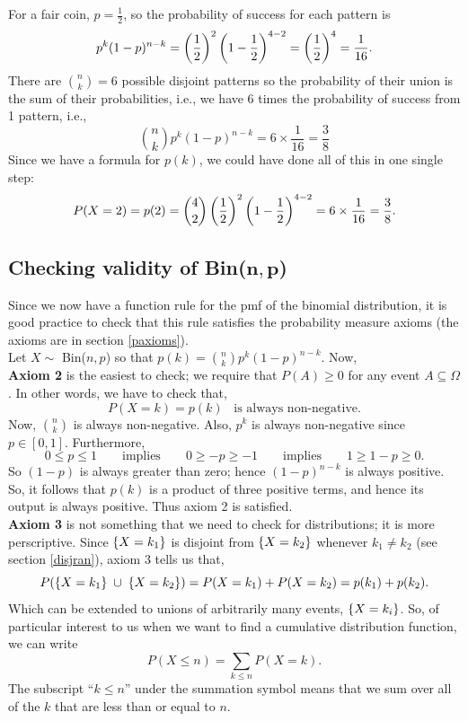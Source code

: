 For a fair coin, $p = \frac{1}{2}$, so the probability of success for each pattern is
\[
p^k(1-p)^{n-k} = \left(\frac{1}{2}\right)^2\left(1-\frac{1}{2}\right)^{4-2} = \left(\frac{1}{2}\right)^4 = \frac{1}{16}.
\]
There are $\binom{n}{k} = 6$ possible disjoint patterns so the probability of their union is the sum of their probabilities, i.e., we have 6 times the probability of success from 1 pattern, i.e., 
\[
\binom{n}{k}p^k(1-p)^{n-k} = 6 \times \frac{1}{16} = \frac{3}{8}
\]
Since we have a formula for $p(k)$, we could have done all of this in one single step: 
\[
P(X = 2) = p(2) = \binom{4}{2}\left(\frac{1}{2}\right)^2\left(1-\frac{1}{2}\right)^{4-2} = 6 \times \frac{1}{16} = \frac{3}{8}.
\]

\subsection{Checking validity of Bin($\boldsymbol{n,p}$)} \label{validity of bin}
Since we now have a function rule for the pmf of the binomial distribution, it is good practice to check that this rule satisfies the probability measure axioms (the axioms are in section \ref{paxioms}). \\

\noindent Let $X \sim$ Bin($n,p$) so that $p(k) = \binom{n}{k}p^k(1-p)^{n-k}$. Now, \\

\noindent \textbf{Axiom 2} is the easiest to check; we require that $P(A) \geq 0$ for any event $A \subseteq \Omega$. In other words, we have to check that,
\[
P(X = k) = p(k) \;\;\; \text{is always non-negative.}
\]
Now, $\binom{n}{k}$ is always non-negative. Also, $p^k$ is always non-negative since $p \in [0,1]$. Furthermore,
\[
0 \leq p \leq 1 \qquad \text{implies} \qquad 0 \geq -p \geq -1 \qquad \text{implies} \qquad 1 \geq 1 - p \geq 0.
\]
So $(1-p)$ is always greater than zero; hence $(1-p)^{n-k}$ is always positive. So, it follows that $p(k)$ is a product of three positive terms, and hence its output is always positive. Thus axiom 2 is satisfied. \\

\noindent \textbf{Axiom 3} is not something that we need to check for distributions; it is more perscriptive. Since $\left\{X = k_1\right\}$ is disjoint from $\left\{X = k_2\right\}$ whenever $k_1 \neq k_2$ (see section \ref{disjran}), axiom 3 tells us that,
\[
P(\left\{X = k_1\right\} \; \cup \; \left\{X = k_2\right\}) = P(X = k_1) + P(X = k_2) = p(k_1) + p(k_2).
\]
Which can be extended to unions of arbitrarily many events, $\left\{X = k_i\right\}$. So, of particular interest to us when we want to find a cumulative distribution function, we can write
\[
P(X \leq n) = \sum_{k \leq n} P(X = k).
\]
The subscript ``$k \leq n$'' under the summation symbol means that we sum over all of the $k$ that are less than or equal to $n$. \\

